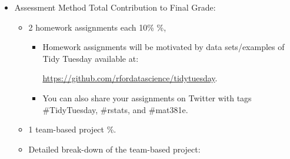 \documentclass[
  12pt,
]{article}
\providecommand{\tightlist}{%
  \setlength{\itemsep}{0pt}\setlength{\parskip}{0pt}}
\begin{document}
\begin{itemize}
\item
  Assessment Method \quad      \quad \quad                Total
  Contribution to Final Grade:

  \begin{itemize}
  \tightlist
  \item
    2 homework assignments each 10\% \quad \quad {}\%,

    \begin{itemize}
    \item
      Homework assignments will be motivated by data sets/examples of
      Tidy Tuesday available at:

      \url{https://github.com/rfordatascience/tidytuesday}.
    \item
      You can also share your assignments on Twitter with tags
      \#TidyTuesday, \#rstats, and \#mat381e.
    \end{itemize}
  \item
    1 team-based project
    \quad \quad {}\%.
  \item
    Detailed break-down of the team-based project:


\end{itemize}
\end{itemize}
\end{document}
